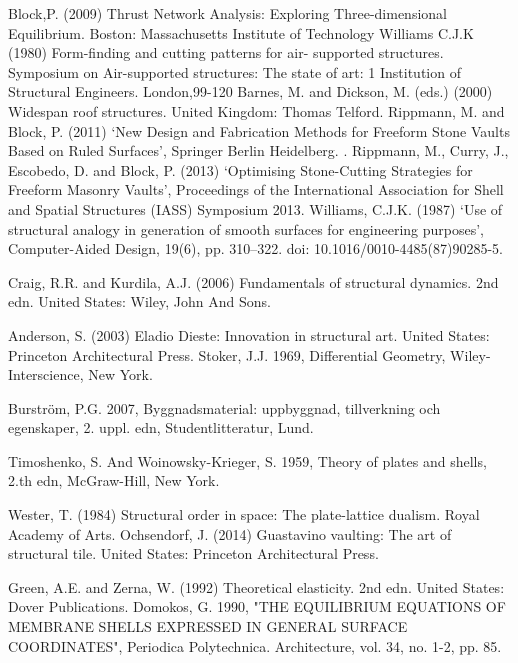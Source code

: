\begin{thebibliography}{69}
 Block,P. (2009) Thrust Network Analysis: Exploring Three-dimensional Equilibrium. Boston: Massachusetts Institute of Technology 
 Williams C.J.K (1980) Form-finding and cutting patterns for air- supported structures. Symposium on Air-supported structures: The state of art: 1 Institution of Structural Engineers. London,99-120
Barnes, M. and Dickson, M. (eds.) (2000) Widespan roof structures. United Kingdom: Thomas Telford.
Rippmann, M. and Block, P. (2011) ‘New Design and Fabrication Methods for Freeform Stone Vaults Based on Ruled Surfaces’, Springer Berlin Heidelberg. .
Rippmann, M., Curry, J., Escobedo, D. and Block, P. (2013) ‘Optimising Stone-Cutting Strategies for Freeform Masonry Vaults’, Proceedings of the International Association for Shell and Spatial Structures (IASS) Symposium 2013. 
 Williams, C.J.K. (1987) ‘Use of structural analogy in generation of smooth surfaces for engineering purposes’, Computer-Aided Design, 19(6), pp. 310–322. doi: 10.1016/0010-4485(87)90285-5.

Craig, R.R. and Kurdila, A.J. (2006) Fundamentals of structural dynamics. 2nd edn. United States: Wiley, John And Sons.

Anderson, S. (2003) Eladio Dieste: Innovation in structural art. United States: Princeton Architectural Press.
 Stoker, J.J. 1969, Differential Geometry, Wiley-Interscience, New York.

Burström, P.G. 2007, Byggnadsmaterial: uppbyggnad, tillverkning och egenskaper, 2. uppl. edn, Studentlitteratur, Lund.

 Timoshenko, S. And Woinowsky-Krieger, S. 1959, Theory of plates and shells, 2.th edn, McGraw-Hill, New York.

Wester, T. (1984) Structural order in space: The plate-lattice dualism. Royal Academy of Arts.
 Ochsendorf, J. (2014) Guastavino vaulting: The art of structural tile. United States: Princeton Architectural Press.

Green, A.E. and Zerna, W. (1992) Theoretical elasticity. 2nd edn. United States: Dover Publications.
Domokos, G. 1990, "THE EQUILIBRIUM EQUATIONS OF MEMBRANE SHELLS EXPRESSED IN GENERAL SURFACE COORDINATES", Periodica Polytechnica. Architecture, vol. 34, no. 1-2, pp. 85.


\end{thebibliography}
